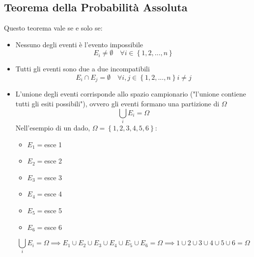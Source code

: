 \documentclass{article}  %
\theoremstyle{definition}
\begin{document}
\subsection{Teorema della Probabilità Assoluta}
Questo teorema vale se e solo se:
\begin{itemize}
	\item Nessuno degli eventi è l'evento impossibile \\
	      \[
		      E_i \neq \emptyset \quad \forall{i} \in \left\{1,2,...,n\right\}
	      \]
	\item Tutti gli eventi sono due a due incompatibili \\
	      \[
		      E_i \cap E_j=\emptyset \quad \forall{i,j} \in \left\{1,2,...,n\right\} i \neq j
	      \]
	\item L'unione degli eventi corrisponde allo spazio campionario ("l'unione contiene tutti gli esiti possibili"), ovvero
	      gli eventi formano una partizione di $\Omega$ \\
	      \[
		      \bigcup_{i} E_i = \Omega
	      \]
	      Nell'esempio di un dado, $\Omega=\left\{1,2,3,4,5,6\right\}$:
	      \begin{itemize}
		      \item $E_1=$esce 1
		      \item $E_2=$esce 2
		      \item $E_3=$esce 3
		      \item $E_4=$esce 4
		      \item $E_5=$esce 5
		      \item $E_6=$esce 6
	      \end{itemize}
	      \[
		      \bigcup_{i} E_i = \Omega \implies E_1 \cup E_2 \cup E_3 \cup E_4 \cup E_5 \cup E_6 = \Omega \implies 1 \cup 2 \cup 3 \cup 4 \cup 5 \cup 6 = \Omega
	      \]
\end{itemize}
\end{document}
